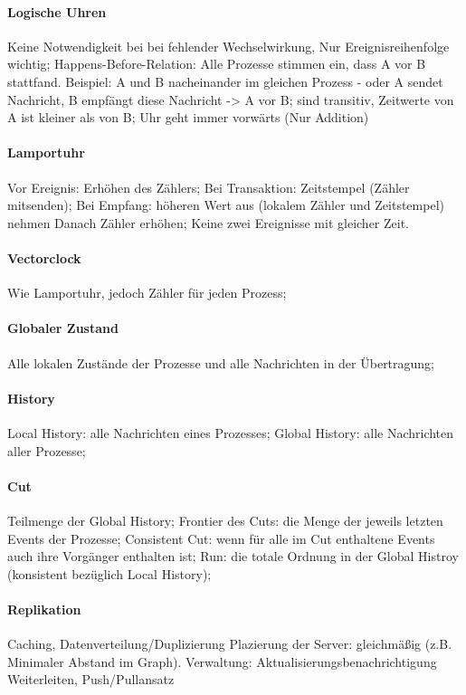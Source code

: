 \documentclass[pagesize,11pt,a4paper]{scrartcl}
\begin{document}
\paragraph*{Logische Uhren}
	Keine Notwendigkeit bei bei fehlender Wechselwirkung, Nur Ereignisreihenfolge wichtig;
	Happens-Before-Relation: Alle Prozesse stimmen ein, dass A vor B stattfand.
		Beispiel: A und B nacheinander im gleichen Prozess -
		oder A sendet Nachricht, B empfängt diese Nachricht -> A vor B;
	sind transitiv, Zeitwerte von A ist kleiner als von B;
	Uhr geht immer vorwärts (Nur Addition)

\paragraph*{Lamportuhr}
	Vor Ereignis: Erhöhen des Zählers;
	Bei Transaktion: Zeitstempel (Zähler mitsenden);
	Bei Empfang: höheren Wert aus (lokalem Zähler und Zeitstempel) nehmen Danach Zähler erhöhen;
	Keine zwei Ereignisse mit gleicher Zeit.

\paragraph*{Vectorclock}
	Wie Lamportuhr, jedoch Zähler für jeden Prozess;

\paragraph*{Globaler Zustand}
	Alle lokalen Zustände der Prozesse und alle Nachrichten in der Übertragung;
	
\paragraph*{History}
	Local History: alle Nachrichten eines Prozesses;
	Global History: alle Nachrichten aller Prozesse;
	
\paragraph*{Cut}
	Teilmenge der Global History;
	Frontier des Cuts: die Menge der jeweils letzten Events der Prozesse;
	Consistent Cut: wenn für alle im Cut enthaltene Events auch ihre Vorgänger enthalten ist;
	Run: die totale Ordnung in der Global Histroy (konsistent bezüglich Local History);

\paragraph*{Replikation}
	Caching, Datenverteilung/Duplizierung
	Plazierung der Server: gleichmäßig (z.B. Minimaler Abstand im Graph).
	Verwaltung: Aktualisierungsbenachrichtigung Weiterleiten, Push/Pullansatz
\end{document}
